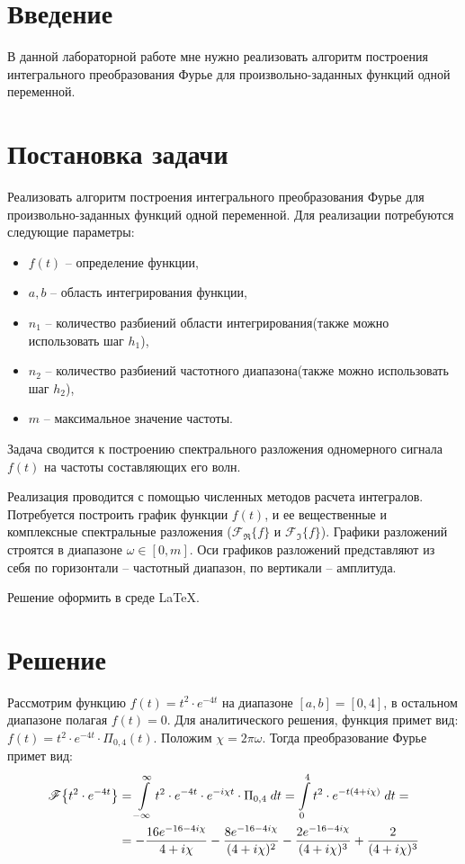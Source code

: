 \documentclass[a4paper, 14pt]{extarticle}
\begin{document}
 
	\pagebreak
	\section{Введение}
		В данной лабораторной работе мне нужно реализовать алгоритм построения интегрального преобразования Фурье для произвольно-заданных функций одной переменной.

	\section{Постановка задачи}
	
		Реализовать алгоритм построения интегрального преобразования
		Фурье для произвольно-заданных функций одной переменной. Для реализации потребуются следующие параметры:
		
		\begin{itemize}
			\item \(f(t)\) -- определение функции,
			\item \(a,b\) -- область интегрирования функции,
			\item \(n_1\) -- количество разбиений области интегрирования(также можно использовать шаг \(h_1\)),
			\item \(n_2	\) -- количество разбиений частотного диапазона(также можно использовать шаг \(h_2\)),
			\item \(m\) -- максимальное значение частоты.
		\end{itemize}
	
		Задача сводится к построению спектрального разложения одномерного сигнала \(f(t) \) на частоты составляющих его волн.
		
		Реализация проводится с помощью численных методов расчета
		интегралов. Потребуется построить график функции \(f(t)\), и ее вещественные и комплексные спектральные разложения (\(\mathscr{F_{\Re}}\{f\}\) и \(\mathscr{F_{\Im}}\{f\}\)).
		Графики разложений строятся в диапазоне \(\omega \in [0, m]\). Оси графиков
		разложений представляют из себя по горизонтали -- частотный диапазон, по вертикали -- амплитуда.
		
		Решение оформить в среде \LaTeX.
	
	\section{Решение}
		Рассмотрим функцию \(f(t)=t^2\cdot e^{-4t}\) на диапазоне \([a, b] = [0, 4]\), в остальном диапазоне полагая \(f(t) = 0\). Для аналитического решения, функция примет вид: \( f(t) = t^2\cdot e^{-4t} \cdot \Pi_{0,4}(t) \). Положим \( \chi = 2\pi\omega \). Тогда преобразование Фурье примет вид:
		\begin{align*} \mathscr{F}\big\{t^2\cdot e^{-4t}\big\} &= \int\displaylimits_{-\infty}^{\infty} t^2\cdot e^{-4t} \cdot e^{-i\chi t} \cdot \Pi_{0,4}\;dt = \int\displaylimits_{0}^{4} t^2\cdot e^{-t(4+i\chi)}\;dt = \\ &= - \dfrac{16e^{-16-4i\chi}}{4+i\chi} - \dfrac{8e^{-16-4i\chi}}{(4+i\chi)^2}  - \dfrac{2e^{-16-4i\chi}}{(4+i\chi)^3} + \dfrac{2}{(4+i\chi)^3} \end{align*}
		
\end{document}
